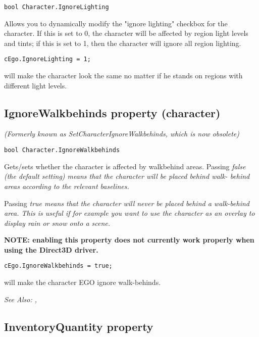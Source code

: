 \begin{verbatim}
bool Character.IgnoreLighting
\end{verbatim}
Allows you to dynamically modify the "ignore lighting" checkbox for the
character. If this is set to 0, the character will be affected by region light
levels and tints; if this is set to 1, then the character will ignore all
region lighting.

\begin{verbatim}
cEgo.IgnoreLighting = 1;
\end{verbatim}
will make the character look the same no matter if he stands on regions with
different light levels.


\subsection{IgnoreWalkbehinds property (character)}\label{Character.IgnoreWalkbehinds}%

\it{(Formerly known as SetCharacterIgnoreWalkbehinds, which is now obsolete)}

\begin{verbatim}
bool Character.IgnoreWalkbehinds
\end{verbatim}
Gets/sets whether the character is affected by walkbehind areas. Passing \it{false}
(the default setting) means that the character will be placed behind walk-
behind areas according to the relevant baselines.

Passing \it{true} means that the character will never be placed behind a walk-behind
area. This is useful if for example you want to use the character as an
overlay to display rain or snow onto a scene.

\bf{NOTE:} enabling this property does not currently work properly when using
the Direct3D driver.

\begin{verbatim}
cEgo.IgnoreWalkbehinds = true;
\end{verbatim}
will make the character EGO ignore walk-behinds.

\it{See Also:} ,


\subsection{InventoryQuantity property}\label{Character.InventoryQuantity}%

